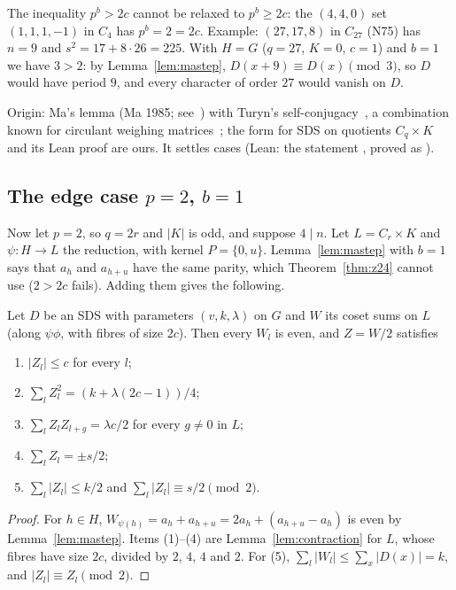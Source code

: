 \begin{remark}\label{rem:z24}
The inequality $p^b > 2c$ cannot be relaxed to $p^b \ge 2c$: the $(4,4,0)$ set $(1,1,1,-1)$ in
$C_4$ has $p^b = 2 = 2c$. Example: $(27,17,8)$ in $C_{27}$ (N75) has $n = 9$ and
$s^2 = 17 + 8 \cdot 26 = 225$. With $H = G$ ($q = 27$, $K = 0$, $c = 1$) and $b = 1$ we have
$3 > 2$: by Lemma~\ref{lem:mastep}, $D(x+9) \equiv D(x) \pmod 3$, so $D$ would have period $9$,
and every character of order $27$ would vanish on $D$.

Origin: Ma's lemma (Ma 1985; see~\cite{pott}) with Turyn's self-conjugacy~\cite{turyn}, a
combination known for circulant weighing matrices~\cite[Results~2.6--2.7]{tan}; the form for SDS
on quotients $C_q \times K$ and its Lean proof are ours. It settles  cases (Lean: the
statement , proved as ).
\end{remark}

\subsection{The edge case $p = 2$, $b = 1$}

Now let $p = 2$, so $q = 2r$ and $|K|$ is odd, and suppose $4 \mid n$. Let $L = C_r \times K$ and
$\psi \colon H \to L$ the reduction, with kernel $P = \{0, u\}$. Lemma~\ref{lem:mastep} with
$b = 1$ says that $a_h$ and $a_{h+u}$ have the same parity, which Theorem~\ref{thm:z24} cannot use
($2 > 2c$ fails). Adding them gives the following.

\begin{lemma}\label{lem:halved}
Let $D$ be an SDS with parameters $(v,k,\lambda)$ on $G$ and $W$ its coset sums on $L$ (along
$\psi\phi$, with fibres of size $2c$). Then every $W_l$ is even, and $Z = W/2$ satisfies
\begin{enumerate}
\item $|Z_l| \le c$ for every $l$;
\item $\sum_l Z_l^2 = (k + \lambda(2c - 1))/4$;
\item $\sum_l Z_l Z_{l+g} = \lambda c/2$ for every $g \ne 0$ in $L$;
\item $\sum_l Z_l = \pm s/2$;
\item $\sum_l |Z_l| \le k/2$ and $\sum_l |Z_l| \equiv s/2 \pmod 2$.
\end{enumerate}
\end{lemma}

\begin{proof}
For $h \in H$, $W_{\psi(h)} = a_h + a_{h+u} = 2a_h + (a_{h+u} - a_h)$ is even by
Lemma~\ref{lem:mastep}. Items (1)--(4) are Lemma~\ref{lem:contraction} for $L$, whose fibres have
size $2c$, divided by $2$, $4$, $4$ and $2$. For (5), $\sum_l |W_l| \le \sum_x |D(x)| = k$, and
$|Z_l| \equiv Z_l \pmod 2$.
\end{proof}


